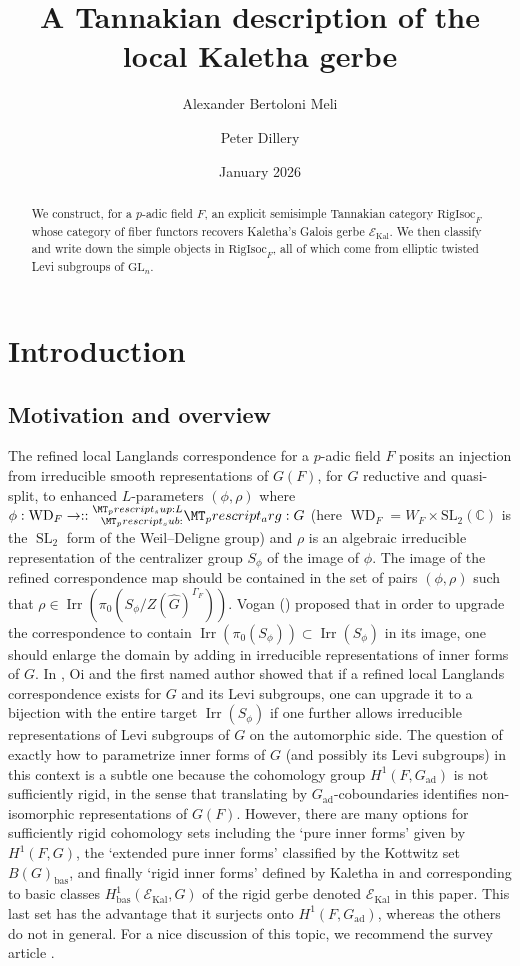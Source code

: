 \documentclass[11pt]{amsart}
\title{A Tannakian description of the local Kaletha gerbe}
\date{January 2026}
\author{Alexander Bertoloni Meli}
\author{Peter Dillery}
\theoremstyle{definition}
\newcommand{\mc}{\mathcal}
\newcommand{\C}{\mathbb{C}}
\newcommand{\RigIsoc}{\mathrm{RigIsoc}}
\newcommand{\GL}{\mathrm{GL}}
\DeclareMathOperator{\Kal}{Kal}
\DeclareMathOperator{\bas}{bas}
\DeclareMathOperator{\ad}{ad}
\DeclareMathOperator{\WD}{WD}
\DeclareMathOperator{\SL}{SL}
\DeclareMathOperator{\Irr}{Irr}
\newcommand{\wh}{\widehat}
\newcommand{\co}[1]{\prescript{#1}{}}
\begin{document}
\maketitle

\begin{abstract}
    We construct, for a $p$-adic field $F$, an explicit semisimple Tannakian category $\RigIsoc_{F}$ whose category of fiber functors recovers Kaletha's Galois gerbe $\mc{E}_{\Kal}$. We then classify and write down the simple objects in $\RigIsoc_{F}$, all of which come from elliptic twisted Levi subgroups of $\GL_{n}$.
\end{abstract}


\section{Introduction}

\subsection{Motivation and overview}
The refined local Langlands correspondence for a $p$-adic field $F$ posits an injection from irreducible smooth representations of $G(F)$, for $G$ reductive and quasi-split, to enhanced $L$-parameters $(\phi, \rho)$ where $\phi: \WD_{F} \rightarrow \co{L}{G}$ (here $\WD_{F} = W_{F} \times \mathrm{SL}_{2}(\C)$ is the $\SL_2$ form of the Weil--Deligne group) and $\rho$ is an algebraic irreducible representation of the centralizer group $S_{\phi}$ of the image of $\phi$. The image of the refined correspondence map should be contained in the set of pairs $(\phi, \rho)$ such that $\rho \in \Irr(\pi_0(S_{\phi}/Z(\wh{G})^{\Gamma_F}))$. Vogan (\cite{VoganLLC}) proposed that in order to upgrade the correspondence to contain $\Irr(\pi_0(S_{\phi})) \subset \Irr(S_{\phi})$ in its image, one should enlarge the domain by adding in irreducible representations of inner forms of $G$. In \cite{BMO}, Oi and the first named author showed that if a refined local Langlands correspondence exists for $G$ and its Levi subgroups, one can upgrade it to a bijection with the entire target $\Irr(S_{\phi})$ if one further allows irreducible representations of Levi subgroups of $G$ on the automorphic side.  The question of exactly how to parametrize inner forms of $G$ (and possibly its Levi subgroups) in this context is a subtle one because the cohomology group $H^1(F, G_{\ad})$ is not sufficiently rigid, in the sense that translating by $G_{\ad}$-coboundaries identifies non-isomorphic representations of $G(F)$. However, there are many options for sufficiently rigid cohomology sets including the `pure inner forms' given by $H^1(F, G)$, the `extended pure inner forms' classified by the Kottwitz set $B(G)_{\bas}$, and finally `rigid inner forms' defined by Kaletha in \cite{Kalannals} and corresponding to basic classes $H_{\bas}^1(\mc{E}_{\Kal}, G)$ of the rigid gerbe denoted $\mc{E}_{\Kal}$ in this paper. This last set has the advantage that it surjects onto $H^1(F, G_{\ad})$, whereas the others do not in general. For a nice discussion of this topic, we recommend the survey article \cite{KalSurvey}.
\end{document}
